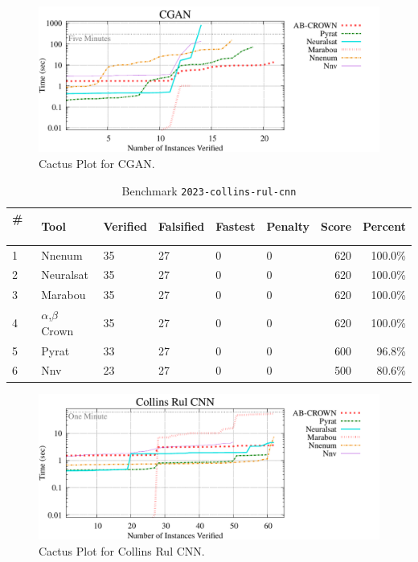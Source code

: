 \begin{figure}[h]
\centerline{\includegraphics[width=\textwidth]{cactus/2023_cgan.pdf}}
\caption{Cactus Plot for CGAN.}
\label{fig:quantPic}
\end{figure}



\begin{table}[h]
\begin{center}
\caption{Benchmark \texttt{2023-collins-rul-cnn}} \label{tab:cat_{cat}}
{\setlength{\tabcolsep}{2pt}
\begin{tabular}[h]{@{}llllllrr@{}}
\toprule
\textbf{\# ~} & \textbf{Tool} & \textbf{Verified} & \textbf{Falsified} & \textbf{Fastest} & \textbf{Penalty} & \textbf{Score} & \textbf{Percent}\\
\midrule
1 & Nnenum & 35 & 27 & 0 & 0 & 620 & 100.0\% \\
2 & Neuralsat & 35 & 27 & 0 & 0 & 620 & 100.0\% \\
3 & Marabou & 35 & 27 & 0 & 0 & 620 & 100.0\% \\
4 & $\alpha$,$\beta$ Crown & 35 & 27 & 0 & 0 & 620 & 100.0\% \\
5 & Pyrat & 33 & 27 & 0 & 0 & 600 & 96.8\% \\
6 & Nnv & 23 & 27 & 0 & 0 & 500 & 80.6\% \\
\bottomrule
\end{tabular}
}
\end{center}
\end{table}



\begin{figure}[h]
\centerline{\includegraphics[width=\textwidth]{cactus/2023_collins_rul_cnn.pdf}}
\caption{Cactus Plot for Collins Rul CNN.}
\label{fig:quantPic}
\end{figure}


